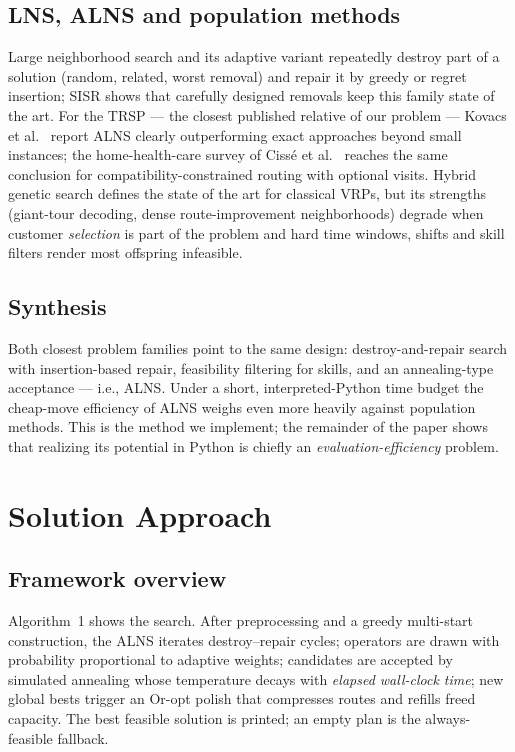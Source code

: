 \documentclass[10pt, a4paper]{article}
\begin{document}
\subsection{LNS, ALNS and population methods}
Large neighborhood search \cite{shaw1998} and its adaptive variant
\cite{ropke2006,pisinger2007} repeatedly destroy part of a solution (random,
related, worst removal) and repair it by greedy or regret insertion; SISR
\cite{christiaens2020} shows that carefully designed removals keep this
family state of the art. For the TRSP --- the closest published relative of
our problem --- Kovacs et al.~\cite{kovacs2012} report ALNS clearly
outperforming exact approaches beyond small instances; the home-health-care
survey of Ciss\'e et al.~\cite{cisse2017} reaches the same conclusion for
compatibility-constrained routing with optional visits. Hybrid genetic search
\cite{vidal2012,vidal2022} defines the state of the art for classical VRPs,
but its strengths (giant-tour decoding, dense route-improvement
neighborhoods) degrade when customer \emph{selection} is part of the problem
and hard time windows, shifts and skill filters render most offspring
infeasible.

\subsection{Synthesis}
Both closest problem families point to the same design: destroy-and-repair
search with insertion-based repair, feasibility filtering for skills, and an
annealing-type acceptance --- i.e., ALNS. Under a short, interpreted-Python
time budget the cheap-move efficiency of ALNS weighs even more heavily
against population methods. This is the method we implement; the remainder of
the paper shows that realizing its potential in Python is chiefly an
\emph{evaluation-efficiency} problem.

\section{Solution Approach}\label{sec:method}

\subsection{Framework overview}
Algorithm~1 shows the search. After preprocessing and a greedy
multi-start construction, the ALNS iterates destroy--repair cycles; operators
are drawn with probability proportional to adaptive weights; candidates are
accepted by simulated annealing whose temperature decays with \emph{elapsed
wall-clock time}; new global bests trigger an Or-opt polish that compresses
routes and refills freed capacity. The best feasible solution is printed; an
empty plan is the always-feasible fallback.
\end{document}
